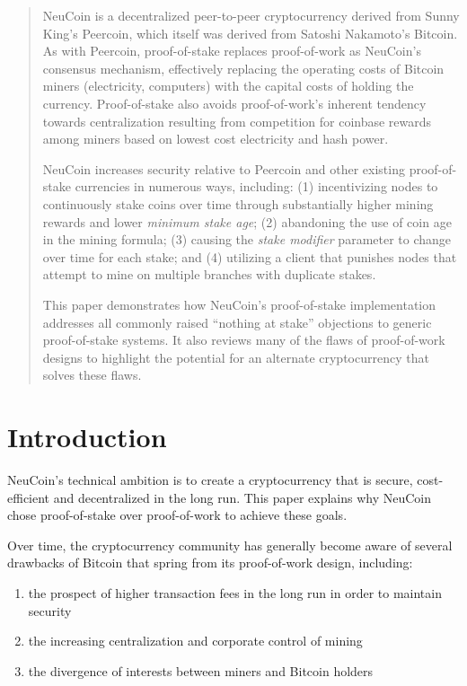 \documentclass[a4paper,11pt]{article}
\begin{document}
\begin{abstract}
NeuCoin is a decentralized peer-to-peer cryptocurrency derived from Sunny King's Peercoin, which itself was derived from Satoshi Nakamoto's Bitcoin. As with Peercoin, proof-of-stake replaces proof-of-work as NeuCoin's consensus mechanism, effectively replacing the operating costs of Bitcoin miners (electricity, computers) with the capital costs of holding the currency. Proof-of-stake also avoids proof-of-work's inherent tendency towards centralization resulting from competition for coinbase rewards among miners based on lowest cost electricity and hash power. 

NeuCoin increases security relative to Peercoin and other existing proof-of-stake currencies in numerous ways, including: (1) incentivizing nodes to continuously stake coins over time through substantially higher mining rewards and lower \textit{minimum stake age}; (2) abandoning the use of coin age in the mining formula; (3) causing the \textit{stake modifier} parameter to change over time for each stake; and (4) utilizing a client that punishes nodes that attempt to mine on multiple branches with duplicate stakes.

This paper demonstrates how NeuCoin's proof-of-stake implementation addresses all commonly raised ``nothing at stake'' objections to generic proof-of-stake systems. It also reviews many of the flaws of proof-of-work designs to highlight the potential for an alternate cryptocurrency that solves these flaws.

\end{abstract}

\vspace{15mm}

\tableofcontents

\newpage

\section{Introduction}
NeuCoin's technical ambition is to create a cryptocurrency that is secure, cost-efficient and decentralized in the long run. This paper explains why NeuCoin chose proof-of-stake over proof-of-work to achieve these goals.
 

Over time, the cryptocurrency community has generally become aware of several drawbacks of Bitcoin that spring from its proof-of-work design, including:
\begin{enumerate}
\setlength{\itemsep}{0pt}
\item{the prospect of higher transaction fees in the long run in order to maintain security}
\item{the increasing centralization and corporate control of mining}
\item{the divergence of interests between miners and Bitcoin holders}
\end{enumerate}
\end{document}
